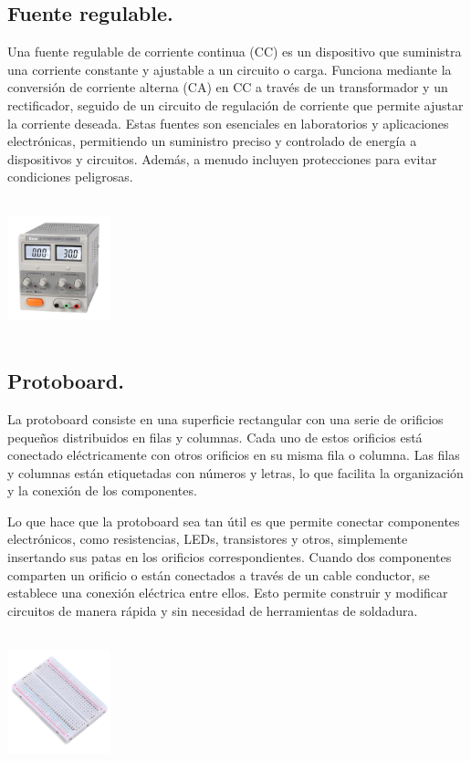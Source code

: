 \documentclass[10pt]{article}
\begin{document}
\begin{multicols}{2}
\begin{center}
	\end{center}
	
	
		
	
	

\subsection{Fuente regulable.}
Una fuente regulable de corriente continua (CC) es un dispositivo que suministra una corriente constante y ajustable a un circuito o carga. Funciona mediante la conversión de corriente alterna (CA) en CC a través de un transformador y un rectificador, seguido de un circuito de regulación de corriente que permite ajustar la corriente deseada. Estas fuentes son esenciales en laboratorios y aplicaciones electrónicas, permitiendo un suministro preciso y controlado de energía a dispositivos y circuitos. Además, a menudo incluyen protecciones para evitar condiciones peligrosas.
\begin{center}
	\includegraphics[width=3cm, height=4cm]{Imagenes/fuente.png}
	
\end{center}

\subsection{Protoboard.}
La protoboard consiste en una superficie rectangular con una serie de orificios pequeños distribuidos en filas y columnas. Cada uno de estos orificios está conectado eléctricamente con otros orificios en su misma fila o columna. Las filas y columnas están etiquetadas con números y letras, lo que facilita la organización y la conexión de los componentes.

Lo que hace que la protoboard sea tan útil es que permite conectar componentes electrónicos, como resistencias, LEDs, transistores y otros, simplemente insertando sus patas en los orificios correspondientes. Cuando dos componentes comparten un orificio o están conectados a través de un cable conductor, se establece una conexión eléctrica entre ellos. Esto permite construir y modificar circuitos de manera rápida y sin necesidad de herramientas de soldadura.
\begin{center}
	\includegraphics[width=3cm, height=4cm]{Imagenes/proto1.jpg}
\end{center}

\end{multicols}
\end{document}

